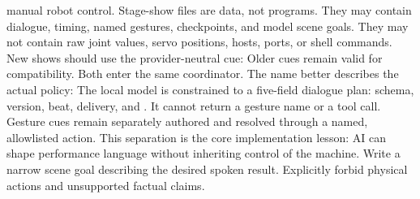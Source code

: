{}manual robot control.\markdownRendererOlItemEnd 
\markdownRendererOlEnd \markdownRendererInterblockSeparator
{}\markdownRendererThematicBreak{}\markdownRendererInterblockSeparator
{}
\markdownRendererSectionEnd 
\markdownRendererSectionEnd \markdownRendererSectionBegin
{}\markdownRendererInterblockSeparator
{}Stage-show files are data, not programs. They may contain dialogue, timing,\markdownRendererSoftLineBreak
{}named gestures, checkpoints, and model scene goals. They may not contain raw\markdownRendererSoftLineBreak
{}joint values, servo positions, hosts, ports, or shell commands.\markdownRendererParagraphSeparator
{}New shows should use the provider-neutral  cue:\markdownRendererInterblockSeparator
{}\markdownRendererInterblockSeparator
{}Older  cues remain valid for compatibility. Both enter the same\markdownRendererSoftLineBreak
{}coordinator. The name  better describes the actual policy:\markdownRendererInterblockSeparator
{}\markdownRendererInterblockSeparator
{}The local model is constrained to a five-field dialogue plan: schema, version,\markdownRendererSoftLineBreak
{}beat, delivery, and . It cannot return a gesture name or a tool\markdownRendererSoftLineBreak
{}call. Gesture cues remain separately authored and resolved through a named,\markdownRendererSoftLineBreak
{}allowlisted action. This separation is the core implementation lesson: AI can\markdownRendererSoftLineBreak
{}shape performance language without inheriting control of the machine.\markdownRendererInterblockSeparator
{}\markdownRendererSectionBegin
{}\markdownRendererInterblockSeparator
{}\markdownRendererOlBegin
{}Write a narrow scene goal describing the desired spoken result.\markdownRendererOlItemEnd 
{}Explicitly forbid physical actions and unsupported factual claims.\markdownRendererOlItemEnd 
